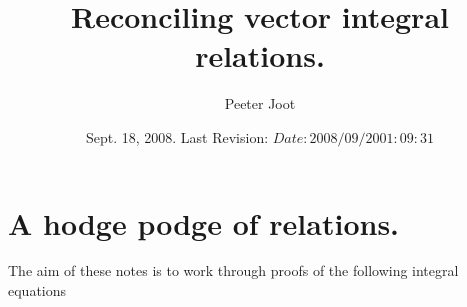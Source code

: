 \documentclass{article}
\title{ Reconciling vector integral relations. }
\author{Peeter Joot}
\date{ Sept. 18, 2008.  Last Revision: $Date: 2008/09/20 01:09:31 $ }
\begin{document}
\maketitle{}

\tableofcontents

\section{ A hodge podge of relations. }


The aim of these notes is to work through proofs of the following 
integral equations
\end{document}
